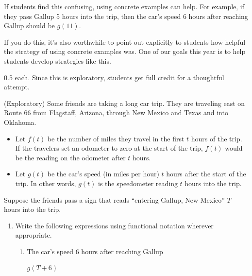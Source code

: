 \documentclass{article}
\begin{document}
\begin{enumerate}
  \begin{workshop}
    If students find this confusing, using concrete examples can help. For example, if they pass Gallup 5 hours into the trip, then the car's speed 6 hours after reaching Gallup should be $g(11)$.

    If you do this, it's also worthwhile to point out explicitly to students how helpful the strategy of using concrete examples was. One of our goals this year is to help students develop strategies like this. 
  \end{workshop}

  \begin{grading}
    0.5 each. Since this is exploratory, students get full credit for a thoughtful attempt.
  \end{grading} 

  (Exploratory) Some friends are taking a long car trip. They are traveling east on Route 66 from Flagstaff, Arizona, through New Mexico and Texas and into Oklahoma.

  \begin{itemize}

  \item Let $f(t)$ be the number of miles they travel in the first $t$ hours of the trip. If the travelers set an odometer to zero at the start of the trip, $f(t)$ would be the reading on the odometer after $t$ hours. 

  \item Let $g(t)$ be the car's speed (in miles per hour) $t$ hours after the start of the trip. In other words, $g(t)$ is the speedometer reading $t$ hours into the trip. 
  \end{itemize}

  Suppose the friends pass a sign that reads ``entering Gallup, New Mexico'' $T$ hours into the trip.
  \begin{enumerate}

  \item Write the following expressions using functional notation wherever
    appropriate.

    \begin{enumerate}

    \item
      \begin{problem}[\vfill]
        The car's speed 6 hours after reaching Gallup
      \end{problem}

      \begin{solution} 
        $g(T+6)$
      \end{solution} 


\end{enumerate}
\end{enumerate}
\end{enumerate}
\end{document}
